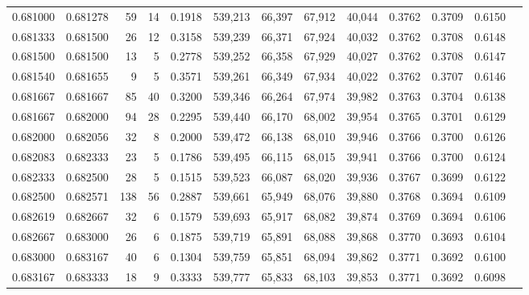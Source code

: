 \begin{tabular}{rrrrrrrrrrrrr}
0.681000 & 0.681278 &    59 &  14 &                                     0.1918 & 539,213 &  66,397 &  67,912 &  40,044 & 0.3762 & 0.3709 & 0.6150 \\
0.681333 & 0.681500 &    26 &  12 &                                     0.3158 & 539,239 &  66,371 &  67,924 &  40,032 & 0.3762 & 0.3708 & 0.6148 \\
0.681500 & 0.681500 &    13 &   5 &                                     0.2778 & 539,252 &  66,358 &  67,929 &  40,027 & 0.3762 & 0.3708 & 0.6147 \\
0.681540 & 0.681655 &     9 &   5 &                                     0.3571 & 539,261 &  66,349 &  67,934 &  40,022 & 0.3762 & 0.3707 & 0.6146 \\
0.681667 & 0.681667 &    85 &  40 &                                     0.3200 & 539,346 &  66,264 &  67,974 &  39,982 & 0.3763 & 0.3704 & 0.6138 \\
0.681667 & 0.682000 &    94 &  28 &                                     0.2295 & 539,440 &  66,170 &  68,002 &  39,954 & 0.3765 & 0.3701 & 0.6129 \\
0.682000 & 0.682056 &    32 &   8 &                                     0.2000 & 539,472 &  66,138 &  68,010 &  39,946 & 0.3766 & 0.3700 & 0.6126 \\
0.682083 & 0.682333 &    23 &   5 &                                     0.1786 & 539,495 &  66,115 &  68,015 &  39,941 & 0.3766 & 0.3700 & 0.6124 \\
0.682333 & 0.682500 &    28 &   5 &                                     0.1515 & 539,523 &  66,087 &  68,020 &  39,936 & 0.3767 & 0.3699 & 0.6122 \\
0.682500 & 0.682571 &   138 &  56 &                                     0.2887 & 539,661 &  65,949 &  68,076 &  39,880 & 0.3768 & 0.3694 & 0.6109 \\
0.682619 & 0.682667 &    32 &   6 &                                     0.1579 & 539,693 &  65,917 &  68,082 &  39,874 & 0.3769 & 0.3694 & 0.6106 \\
0.682667 & 0.683000 &    26 &   6 &                                     0.1875 & 539,719 &  65,891 &  68,088 &  39,868 & 0.3770 & 0.3693 & 0.6104 \\
0.683000 & 0.683167 &    40 &   6 &                                     0.1304 & 539,759 &  65,851 &  68,094 &  39,862 & 0.3771 & 0.3692 & 0.6100 \\
0.683167 & 0.683333 &    18 &   9 &                                     0.3333 & 539,777 &  65,833 &  68,103 &  39,853 & 0.3771 & 0.3692 & 0.6098 \\

\end{tabular}
